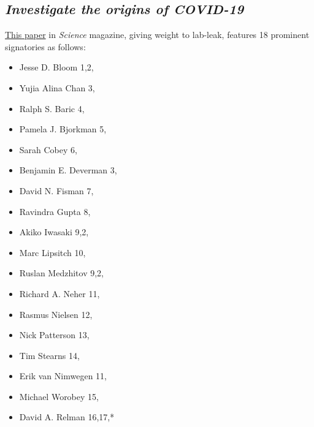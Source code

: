 \documentclass[11pt]{article}
\begin{document}
\subsection{\emph{Investigate the origins of COVID-19}}
\label{sec:orgc033c3e}
\href{https://science.sciencemag.org/content/372/6543/694.1}{This paper} in \emph{Science} magazine, giving weight to lab-leak, features 18 prominent signatories as follows:
\begin{itemize}
\item Jesse D. Bloom 1,2,
\item Yujia Alina Chan 3,
\item Ralph S. Baric 4,
\item Pamela J. Bjorkman 5,
\item Sarah Cobey 6,
\item Benjamin E. Deverman 3,
\item David N. Fisman 7,
\item Ravindra Gupta 8,
\item Akiko Iwasaki 9,2,
\item Marc Lipsitch 10,
\item Ruslan Medzhitov 9,2,
\item Richard A. Neher 11,
\item Rasmus Nielsen 12,
\item Nick Patterson 13,
\item Tim Stearns 14,
\item Erik van Nimwegen 11,
\item Michael Worobey 15,
\item David A. Relman 16,17,*\label{relman}


\end{itemize}
\end{document}
